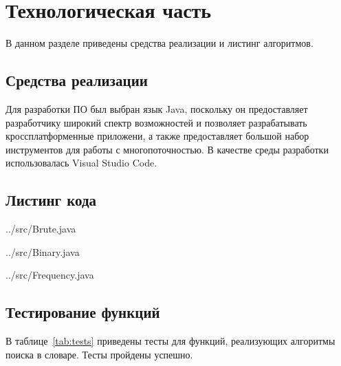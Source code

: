 \chapter{Технологическая часть}

В данном разделе приведены средства реализации и листинг алгоритмов.

\section{Средства реализации}

Для разработки ПО был выбран язык Java, поскольку он предоставляет разработчику широкий спектр возможностей и позволяет разрабатывать кроссплатформенные приложени, а также предоставляет большой набор инструментов для работы с многопоточностью. В качестве среды разработки использовалась Visual Studio Code. \cite{code}

\section{Листинг кода}


\begin{lstinputlisting}[
	caption={Реализация алгоритма поиска полным перебором},
	label={lst:first},
	style={javalang},
	linerange={1-15}
]{../src/Brute.java}
\end{lstinputlisting}


\begin{lstinputlisting}[
	caption={Реализация бинарного поиска},
	label={lst:second},
	style={javalang},
	linerange={1-26}
]{../src/Binary.java}
\end{lstinputlisting}


\begin{lstinputlisting}[
	caption={Реализация поиска с ипользованием частотного анализа},
	label={lst:second},
	style={javalang},
	linerange={1-60}
]{../src/Frequency.java}
\end{lstinputlisting}


\section{Тестирование функций}

В таблице~\ref{tab:tests} приведены тесты для функций, реализующих алгоритмы поиска в словаре. Тесты пройдены успешно.

